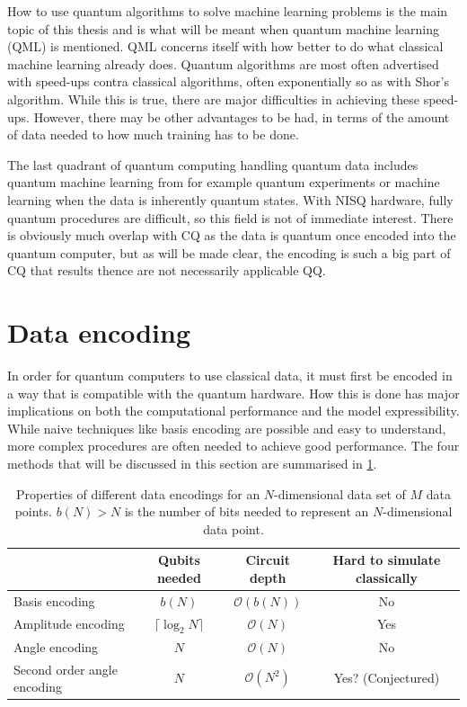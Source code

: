 How to use quantum algorithms to solve machine learning problems is the main topic of this thesis and is what will be meant when quantum machine learning (QML) is mentioned. QML concerns itself with how better to do what classical machine learning already does. Quantum algorithms are most often advertised with speed-ups contra classical algorithms, often exponentially so as with Shor's algorithm. While this is true, there are major difficulties in achieving these speed-ups. However, there may be other advantages to be had, in terms of the amount of data needed to how much training has to be done.

The last quadrant of quantum computing handling quantum data includes quantum machine learning from for example quantum experiments or machine learning when the data is inherently quantum states. With NISQ hardware, fully quantum procedures are difficult, so this field is not of immediate interest. There is obviously much overlap with CQ as the data is quantum once encoded into the quantum computer, but as will be made clear, the encoding is such a big part of CQ that results thence are not necessarily applicable QQ.




\section{Data encoding}
\label{sec:data_encoding}
In order for quantum computers to use classical data, it must first be encoded in a way that is compatible with the quantum hardware. How this is done has major implications on both the computational performance and the model expressibility. While naive techniques like basis encoding are possible and easy to understand, more complex procedures are often needed to achieve good performance. The four methods that will be discussed in this section are summarised in \cref{tab:data_encoding}.

\begin{table}
    \centering
    \renewcommand{\arraystretch}{1.5}
    \begin{tabular}{l|c|c|c}

                                    & Qubits needed           & Circuit depth       & Hard to simulate classically \\
        \hline
        Basis encoding              & $b(N)$                  & $\mathcal{O}(b(N))$ & No                           \\
        Amplitude encoding          & $\lceil\log_2{N}\rceil$ & $\mathcal{O}(N)$    & Yes                          \\
        Angle encoding              & $N$                     & $\mathcal{O}(N)$    & No                           \\
        Second order angle encoding & $N$                     & $\mathcal{O}(N^2)$  & Yes? (Conjectured)
    \end{tabular}
    \caption{Properties of different data encodings for an $N$-dimensional data set of $M$ data points. $b(N)>N$ is the number of bits needed to represent an $N$-dimensional data point.}
    \label{tab:data_encoding}
\end{table}


